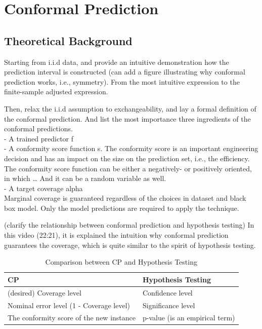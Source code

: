 \documentclass[a4paper,oneside,bibliography=totoc]{scrbook}
\begin{document}
\section{Conformal Prediction}
\label{sec: reviewCP}

\subsection{Theoretical Background}
Starting from i.i.d data, and provide an intuitive demonstration how the prediction interval is constructed (can add a figure illustrating why conformal prediction works, i.e., symmetry). From the most intuitive expression to the finite-sample adjusted expression. 
		
\begin{description}[leftmargin=0cm]
	\item [Notation] Then, relax the i.i.d assumption to exchangeability, and lay a formal definition of the conformal prediction. And list the most importance three ingredients of the conformal predictions. \\
	- A trained predictor f \\
	- A conformity score function s. The conformity score is an important engineering decision and has an impact on the size on the prediction set, i.e., the efficiency. The conformity score function can be either a negatively- or positively oriented, in which … And it can be a random variable as well. \\
	-	A target coverage alpha	\\

		Marginal coverage is guaranteed regardless of the choices in dataset and black
		box model. Only the model predictions are required to apply the technique.
	\item [A Link to Statistical Testing] (clarify the relationship between conformal prediction and hypothesis testing) In this video (22:21), it is explained the intuition why conformal prediction guarantees the coverage, which is quite similar to the spirit of hypothesis testing. 
	
	     \begin{table}[h]
    		\centering
    		\caption{Comparison between CP and Hypothesis Testing}

    		\renewcommand{\arraystretch}{1.2}
   			\begin{tabular}{| m{6cm} | m{6cm} |}
     			\hline
      		   	\textbf{CP} & \textbf{Hypothesis Testing} \\
               	\hline
        		(desired) Coverage level & Confidence level \\
        	   	\hline
        		Nominal error level (1 - Coverage level) & Significance level \\
        		\hline
        		The conformity score of the new instance & p-value (is an empirical term) \\
        		\hline
    		\end{tabular}
        	\label{tab:comparison}
		\end{table}
	  	

\end{description}
\end{document}
